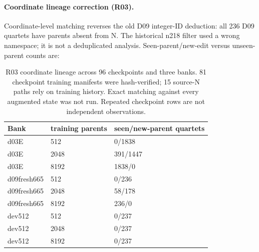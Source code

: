 \paragraph{Coordinate lineage correction (R03).} Coordinate-level matching reverses the old D09 integer-ID deduction: all 236 D09 quartets have parents absent from N. The historical n218 filter used a wrong namespace; it is not a deduplicated analysis. Seen-parent/new-edit versus unseen-parent counts are:
\begin{table}[t]\centering\small\begin{tabular}{@{}lll@{}}\toprule
Bank & training parents & seen/new-parent quartets \\
\midrule
d03E & 512 & 0/1838 \\
d03E & 2048 & 391/1447 \\
d03E & 8192 & 1838/0 \\
d09fresh665 & 512 & 0/236 \\
d09fresh665 & 2048 & 58/178 \\
d09fresh665 & 8192 & 236/0 \\
dev512 & 512 & 0/237 \\
dev512 & 2048 & 0/237 \\
dev512 & 8192 & 0/237 \\
\bottomrule\end{tabular}\caption{R03 coordinate lineage across 96 checkpoints and three banks. 81 checkpoint training manifests were hash-verified; 15 source-N paths rely on training history. Exact matching against every augmented state was not run. Repeated checkpoint rows are not independent observations.}\end{table}
